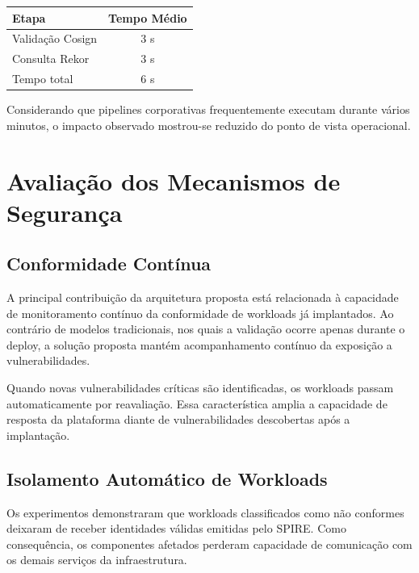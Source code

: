 \begin{table}[htbp]
\centering
{}
\label{tab:attestation}
\begin{tabular}{|l|c|}
\hline
\textbf{Etapa} & \textbf{Tempo Médio} \\
\hline
Validação Cosign & 3 s \\
\hline
Consulta Rekor & 3 s \\
\hline
Tempo total & 6 s \\
\hline
\end{tabular}
\end{table}

Considerando que pipelines corporativas frequentemente executam durante vários minutos, o impacto observado mostrou-se reduzido do ponto de vista operacional.

\section{Avaliação dos Mecanismos de Segurança}
\label{sec:avaliacao-seguranca}

\subsection{Conformidade Contínua}
\label{subsec:conformidade-continua-resultados}

A principal contribuição da arquitetura proposta está relacionada à capacidade de monitoramento contínuo da conformidade de workloads já implantados. Ao contrário de modelos tradicionais, nos quais a validação ocorre apenas durante o deploy, a solução proposta mantém acompanhamento contínuo da exposição a vulnerabilidades.

Quando novas vulnerabilidades críticas são identificadas, os workloads passam automaticamente por reavaliação. Essa característica amplia a capacidade de resposta da plataforma diante de vulnerabilidades descobertas após a implantação.

\subsection{Isolamento Automático de Workloads}
\label{subsec:isolamento-workloads}

Os experimentos demonstraram que workloads classificados como não conformes deixaram de receber identidades válidas emitidas pelo SPIRE. Como consequência, os componentes afetados perderam capacidade de comunicação com os demais serviços da infraestrutura.

